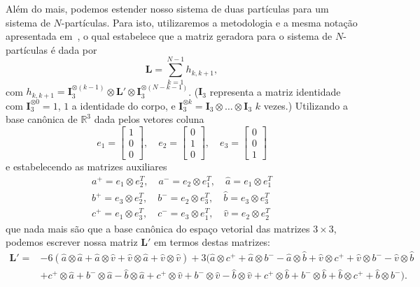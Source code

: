 \documentclass[twoside,openright,titlepage,numbers=noenddot,headinclude,  lineheaders footinclude=true,cleardoublepage=empty,
                                BCOR=5mm,paper=a4,fontsize=12pt ]{scrbook}
\theoremstyle{definition}
\begin{document}
Além do mais, podemos estender nosso sistema de duas partículas para um sistema de $N$-partículas.
Para isto, utilizaremos a metodologia e a mesma notação apresentada em~\cite{Nparticulas}, o qual
estabelece que a matriz geradora para o sistema de $N$-partículas é dada por
\[
\bm{L} = \sum_{k = 1}^{N-1} h_{k, k+1},
\]
com $h_{k, k+1} = \bm{I}_3^{\otimes (k-1)} \otimes \bm{L}' \otimes \bm{I}_3^{ \otimes (N-k-1) }$.
($\bm{I}_3$ representa a matriz identidade com $\bm{I}_3^{\otimes 0} = 1$, $1$ a identidade
do corpo, e $\bm{I}_3^{\otimes k} = \bm{I}_3 \otimes \ldots \otimes \bm{I}_3$ $k$ vezes.)
Utilizando a base canônica de $\mathbb{R}^3$ dada pelos vetores coluna
\[
e_1 = 
\begin{bmatrix} 1 \\ 0 \\ 0 \end{bmatrix}, \quad
e_2 = 
\begin{bmatrix} 0 \\ 1 \\ 0 \end{bmatrix}, \quad
e_3 = 
\begin{bmatrix} 0 \\ 0 \\ 1 \end{bmatrix}
\]
e estabelecendo as matrizes auxiliares
\begin{align*}\tag{ $\ast$}
a^+ = e_1 \otimes e_2^T,\quad  a^- = e_2 \otimes e_1^T,\quad  \widehat{a} = e_1 \otimes e_1^T\\
b^+ = e_3 \otimes e_2^T,\quad  b^- = e_2 \otimes e_3^T,\quad  \widehat{b} = e_3 \otimes e_3^T\\
c^+ = e_1 \otimes e_3^T,\quad  c^- = e_3 \otimes e_1^T,\quad  \widehat{v} = e_2 \otimes e_2^T
\end{align*}
que nada mais são que a base canônica do espaço vetorial das matrizes $3\times3$, podemos
escrever nossa matriz $\bm{L}'$ em termos destas matrizes:
\begin{align*} 
\bm{L}' =& -6 ( \widehat{a} \otimes \widehat{a} + \widehat{a} \otimes \widehat{v} + \widehat{v} \otimes \widehat{a} + 
		\widehat{v} \otimes \widehat{v}) 
     +3 ( \widehat{a} \otimes c^+ + \widehat{a} \otimes b^- - \widehat{a} \otimes \widehat{b} 
     + \widehat{v} \otimes c^+ + \widehat{v} \otimes b^- - \widehat{v} \otimes \widehat{b} \\
  & + c^+ \otimes \widehat{a} + b^- \otimes \widehat{a} - \widehat{b} \otimes \widehat{a} 
   + c^+ \otimes \widehat{v} + b^- \otimes \widehat{v} - \widehat{b} \otimes \widehat{v}
   + c^+ \otimes \widehat{b} + b^- \otimes \widehat{b} + \widehat{b} \otimes c^+ + \widehat{b} \otimes b^-).
\end{align*}
\end{document}
